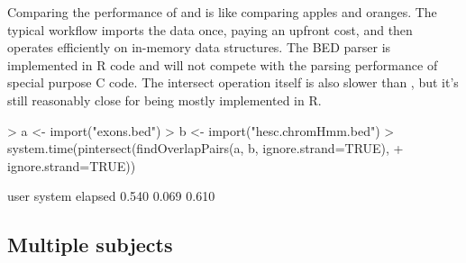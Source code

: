 \documentclass[10pt]{article}
\begin{document}
Comparing the performance of  and 
is like comparing apples and oranges. The typical \Bioconductor{}
workflow imports the data once, paying an upfront cost, and then
operates efficiently on in-memory data structures. The BED parser is
implemented in R code and will not compete with the parsing
performance of special purpose C code. The intersect operation itself
is also slower than , but it's still reasonably
close for being mostly implemented in R.
\begin{Schunk}
\begin{Sinput}
> a <- import("exons.bed")
> b <- import("hesc.chromHmm.bed")
> system.time(pintersect(findOverlapPairs(a, b, ignore.strand=TRUE),
+                        ignore.strand=TRUE))
\end{Sinput}
\begin{Soutput}
   user  system elapsed 
  0.540   0.069   0.610 
\end{Soutput}
\end{Schunk}

\subsection{Multiple subjects}
\end{document}
